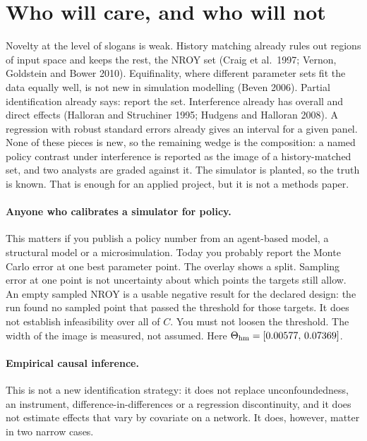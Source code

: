 \documentclass[11pt]{article}
\newcommand{\hm}{\mathrm{hm}}
\begin{document}
\section{Who will care, and who will not}

Novelty at the level of slogans is weak. History matching already rules out
regions of input space and keeps the rest, the NROY set (Craig et al.\ 1997;
Vernon, Goldstein and Bower 2010). Equifinality, where different parameter
sets fit the data equally well, is not new in simulation modelling
(Beven 2006). Partial identification already
says: report the set. Interference already has overall and direct
effects (Halloran and Struchiner 1995; Hudgens and Halloran 2008). A regression with robust
standard errors already gives an interval for a given panel. None of
these pieces is new, so the remaining wedge is the composition: a named
policy contrast under interference is reported as the image of a
history-matched set, and two analysts are graded against it. The
simulator is planted, so the truth is known. That is enough for an
applied project, but it is not a methods paper.

\paragraph{Anyone who calibrates a simulator for policy.}
This matters if you publish a policy number from an agent-based model, a
structural model or a microsimulation. Today you probably report the
Monte Carlo error at one best parameter point. The overlay shows a split.
Sampling error at one point is not uncertainty about which points the
targets still allow. An empty sampled NROY is a usable negative result for the declared
design: the run found no sampled point that passed the threshold for
those targets. It does not establish infeasibility over all of $C$. You
must not loosen the threshold. The width of the image is measured, not assumed. Here
$\Theta_{\hm}=[\ThetaHmLo,\,\ThetaHmHi]$.

\paragraph{Empirical causal inference.}
This is not a new identification strategy: it does not replace
unconfoundedness, an instrument, difference-in-differences or a
regression discontinuity, and it does not estimate effects that vary by
covariate on a network. It does, however, matter in two narrow cases.
\end{document}
